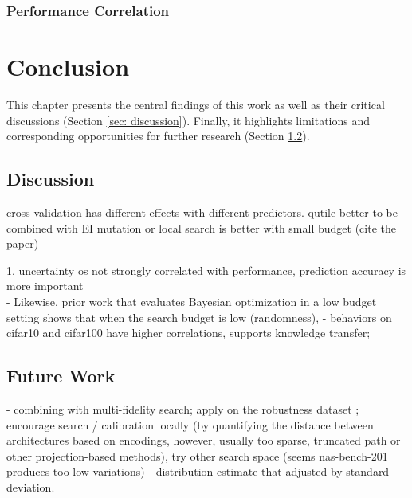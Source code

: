 \documentclass[a4paper,oneside,bibliography=totoc]{scrbook}
\begin{document}
\subsection{Performance Correlation}



\chapter{Conclusion}
This chapter presents the central findings of this work as well as their critical discussions (Section \ref{sec: discussion}). Finally, it highlights limitations and corresponding opportunities for further research (Section \ref{sec: future_work}).

\section{Discussion}
cross-validation has different effects with different predictors.
qutile better to be combined with EI
mutation or local search is better with small budget (cite the paper)
\label{sec: discussion}



1.  uncertainty os not strongly correlated with performance, prediction accuracy is more important \\

- Likewise, prior work that evaluates Bayesian optimization in a low budget setting shows that when the search budget is low (randomness), 
- behaviors on cifar10 and cifar100 have higher correlations, supports knowledge transfer; 

\section{Future Work}
\label{sec: future_work}
- combining with multi-fidelity search; apply on the robustness dataset ; encourage search / calibration locally (by quantifying the distance between architectures based on encodings, however, usually too sparse, truncated path or other projection-based methods), try other search space (seems nas-bench-201 produces too low variations)
- distribution estimate that adjusted by standard deviation.





\listofalgorithms 
\listoffigures 
\listoftables
\printglossary[type=\acronymtype, title=Acronyms]
\end{document}
